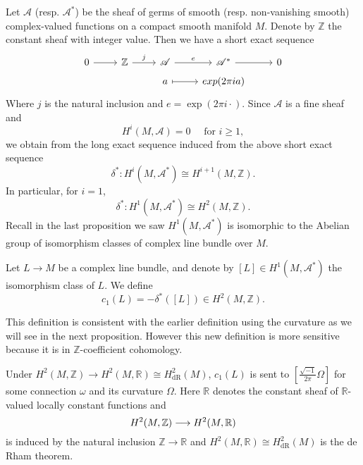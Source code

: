 \documentclass[12pt]{article}
\begin{document}
Let \(\mathscr{A}\) (resp. \(\mathscr{A}^*\)) be the sheaf of germs of smooth
(resp. non-vanishing smooth) complex-valued functions on a compact smooth manifold
\(M\). Denote by \(\mathbb{Z}\) the constant sheaf with integer value. Then we have
a short exact sequence 
\[\begin{tikzcd}[row sep=tiny]
	0 & {\mathbb{Z}} & {\mathscr{A}} & {\mathscr{A}^*} & 0 \\
	&& a & {exp(2\pi ia)}
	\arrow[from=1-1, to=1-2]
	\arrow["j", from=1-2, to=1-3]
	\arrow["e", from=1-3, to=1-4]
	\arrow[from=1-4, to=1-5]
	\arrow[maps to, from=2-3, to=2-4]
\end{tikzcd}\]
Where \(j\) is the natural inclusion and \(e=\exp(2\pi i \cdot )\). Since
\(\mathscr{A}\) is a fine sheaf and \[
  H^i(M,\mathscr{A})=0\quad\text{ for }i\ge 1
,\] we obtain from the long exact sequence induced from the above short exact
sequence \[
  \delta^*\colon H^i(M,\mathscr{A}^*)\cong H^{i+1}(M,\mathbb{Z})
.\] In particular, for \(i=1\), \[
  \delta^*\colon H^1(M,\mathscr{A}^*)\cong H^2(M,\mathbb{Z})
.\] Recall in the last proposition we saw \(H^1(M,\mathscr{A}^*)\) is isomorphic
to the Abelian group of isomorphism classes of complex line bundle over \(M\).
\begin{definition}
  Let \(L\to M\) be a complex line bundle, and denote by \([L]\in H^1(M,\mathscr{A}^*)
  \) the isomorphism class of \(L\). We define \[
    c_1(L)=-\delta^*([L])\in H^2(M,\mathbb{Z})
  .\] 
\end{definition}
This definition is consistent with the earlier definition using the curvature as
we will see in the next proposition. However this new definition is more sensitive
because it is in \(\mathbb{Z}\)-coefficient cohomology.
\begin{prop}
  Under \(H^2(M,\mathbb{Z})\to H^2(M,\mathbb{R})\cong H_{\mathrm{dR}}^2(M)\),
  \(c_1(L)\) is sent to \(\left[\frac{\sqrt{-1}}{2\pi}\Omega\right]\) for some
  connection \(\omega\) and its curvature \(\Omega\). Here \(\mathbb{R}\) denotes the
  constant sheaf of \(\mathbb{R}\)-valued locally constant functions and \[
    H^2(M,\mathbb{Z})\longrightarrow H^2(M,\mathbb{R})
  \] is induced by the natural inclusion \(\mathbb{Z}\to \mathbb{R}\) and 
  \(H^2(M,\mathbb{R})\cong H^2_{\mathrm{dR}}(M)\) is the de Rham theorem.
\end{prop}
\end{document}
